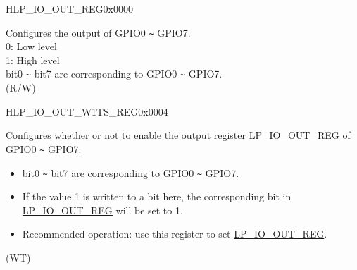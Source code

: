 \begin{register}{H}{LP\_IO\_OUT\_REG}{0x0000}\label{regdesc:LPIOOUTREG}
%
%
\regnewline%
\begin{regdesc}\begin{reglist}
\label{fielddesc:LPIOOUTDATA}\item [LP\_GPIO\_OUT\_DATA] Configures the output of GPIO0 \verb+~+ GPIO7.\\
0: Low level\\
1: High level\\
bit0 \verb+~+ bit7 are corresponding to GPIO0 \verb+~+ GPIO7.\\ (R/W)
\end{reglist}\end{regdesc}
\end{register}


\begin{register}{H}{LP\_IO\_OUT\_W1TS\_REG}{0x0004}\label{regdesc:LPIOOUTW1TSREG}
%
%
\regnewline%
\begin{regdesc}\begin{reglist}
\label{fielddesc:LPIOOUTDATAW1TS}\item [LP\_GPIO\_OUT\_DATA\_W1TS] Configures whether or not to enable the output register \hyperref[regdesc:LPIOOUTREG]{LP\_IO\_OUT\_REG} of GPIO0 \verb+~+ GPIO7.\\
\begin{itemize}
    \item bit0 \verb+~+ bit7 are corresponding to GPIO0 \verb+~+ GPIO7.
    \item If the value 1 is written to a bit here, the corresponding bit in \hyperref[regdesc:LPIOOUTREG]{LP\_IO\_OUT\_REG} will be set to 1.
    \item Recommended operation: use this register to set \hyperref[regdesc:LPIOOUTREG]{LP\_IO\_OUT\_REG}. \end{itemize} (WT)
\end{reglist}\end{regdesc}
\end{register}


